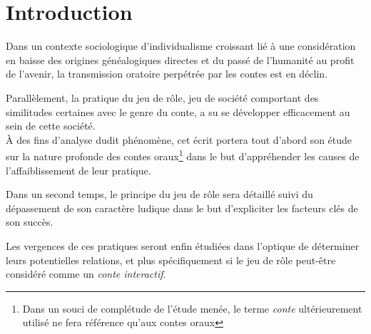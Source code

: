 \section*{Introduction}

Dans un contexte sociologique d'individualisme croissant lié à une considération en baisse des origines généalogiques directes et du passé de l'humanité au profit de l'avenir, la transmission oratoire perpétrée par les contes est en déclin.

Parallèlement, la pratique du jeu de rôle, jeu de société comportant des similitudes certaines avec le genre du conte, a su se développer efficacement au sein de cette société.\\


À des fins d'analyse dudit phénomène, cet écrit portera tout d'abord son étude sur la nature profonde des contes oraux\footnote{Dans un souci de complétude de l'étude menée, le terme \textit{conte} ultérieurement utilisé ne fera référence qu'aux contes oraux} dans le but d'appréhender les causes de l'affaiblissement de leur pratique.

Dans un second temps, le principe du jeu de rôle sera détaillé suivi du dépassement de son caractère ludique dans le but d'expliciter les facteurs clés de son succès.

Les vergences de ces pratiques seront enfin étudiées dans l'optique de déterminer leurs potentielles relations, et plus spécifiquement si le jeu de rôle peut-être considéré comme un \textit{conte interactif}.

\clearpage
